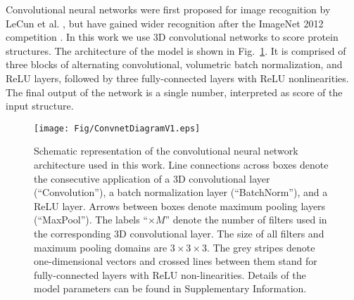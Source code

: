 Convolutional neural networks were first proposed for image
recognition by LeCun et al. \cite{lecun1989backpropagation}, but have
gained wider recognition after the ImageNet 2012
competition \cite{krizhevsky2012imagenet}.  In this work we use 3D
convolutional networks to score protein structures. The architecture
of the model is shown in Fig.\ \ref{Fig:CNNModel}.  It is comprised of
three blocks of alternating convolutional, volumetric batch
normalization, and ReLU layers, followed by three fully-connected
layers with ReLU nonlinearities. The final output of the network is a
single number, interpreted as  score of the input structure.

\begin{figure}[H]
    \centering
    \texttt{[image: Fig/ConvnetDiagramV1.eps]}

    \caption{Schematic representation of the convolutional neural
    network architecture used in this work.  Line connections across
    boxes denote the consecutive application of a 3D convolutional
    layer (``Convolution''), a batch normalization layer
    (``BatchNorm''), and a ReLU layer. Arrows between boxes denote
    maximum pooling layers (``MaxPool''). The labels ``$\times M$''
    denote the number of filters used in the corresponding 3D
    convolutional layer. The size of all filters and maximum pooling
    domains are $3\times 3\times 3$. The grey stripes denote
    one-dimensional vectors and crossed lines between them stand for
    fully-connected layers with ReLU non-linearities. Details of the
    model parameters can be found in Supplementary Information.}

    \label{Fig:CNNModel}
\end{figure}

